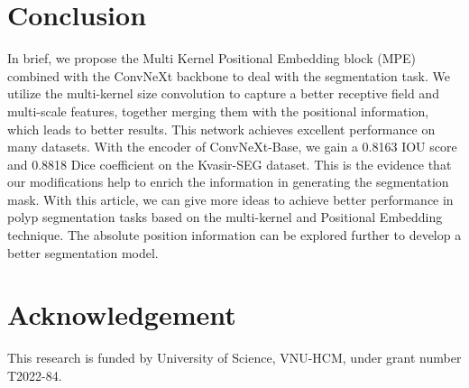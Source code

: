 \documentclass[conference]{IEEEtran}
\begin{document}
\section{Conclusion}
\label{sec:Conclusion}
In brief, we propose the Multi Kernel Positional Embedding block (MPE) combined with the ConvNeXt backbone to deal with the segmentation task. We utilize the multi-kernel size convolution to capture a better receptive field and multi-scale features, together merging them with the positional information, which leads to better results. This network achieves excellent performance on many datasets. With the encoder of ConvNeXt-Base, we gain a 0.8163 IOU score and 0.8818 Dice coefficient on the Kvasir-SEG dataset. This is the evidence that our modifications help to enrich the information in generating the segmentation mask. With this article, we can give more ideas to achieve better performance in polyp segmentation tasks based on the multi-kernel and Positional Embedding technique. The absolute position information can be explored further to develop a better segmentation model.

\section*{Acknowledgement}
This research is funded by University of Science, VNU-HCM, under grant number T2022-84.
\balance


\end{document}
